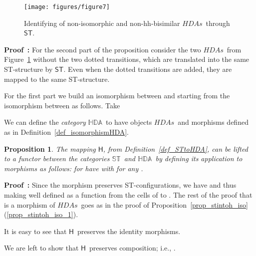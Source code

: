 \documentclass[submission,copyright,creativecommons]{eptcs}
\newtheorem{proposition}[theorem]{Proposition}
\newenvironment{proof}[1][\!\!\,]{\vspace{1ex}\noindent\textbf{Proof #1: }}{\hfill\vspace{2ex}}
\newcommand{\cp}[1]{}
\newcommand\HDAs{\ensuremath{\mathit{HDAs}}}
\newcommand\allST{\ensuremath{\mathbb{ST}}}
\newcommand\allHDA{\ensuremath{\mathbb{HDA}}}
\newcommand\stintoh{\ensuremath{\mathsf{H}}}
\newcommand\hintost{\ensuremath{\mathsf{ST}}}
\newcommand\categoryST{\ensuremath{\allST}}
\newcommand\categoryHDA{\ensuremath{\allHDA}}
\begin{document}
\begin{figure}[tp]
\psfrag{HDA}{{\scriptsize on \HDAs}}
  \begin{center}
    \texttt{[image: figures/figure7]}
  \end{center}
\caption{Identifying of non-isomorphic and non-hh-bisimilar \HDAs\ through \hintost.}
\label{fig_ex_Glabbeek}
\end{figure}

\begin{proof}
For the second part of the proposition consider the two \HDAs\ from Figure~\ref{fig_ex_Glabbeek} without the two dotted transitions, which are translated into the same ST-structure by \hintost. Even when the dotted transitions are added, they are mapped to the same ST-structure.

For the first part we build an isomorphism  between   and  starting from the isomorphism  between  as follows. Take 

\cp{Finish proof for part 1!!}
\end{proof}




We can define the \emph{category} \categoryHDA\ to have objects \HDAs\ and morphisms defined as in Definition~\ref{def_isomorphismHDA}.


\begin{proposition}
The mapping \stintoh, from Definition~\ref{def_STtoHDA}, can be lifted to a functor between the categories \categoryST\ and \categoryHDA\ by defining its application to morphisms as follows: for  have  with  for any .
\end{proposition}

\begin{proof}
Since the morphism  preserves ST-configurations, we have  and thus  making  well defined as a function from the cells of  to . The rest of the proof that  is a morphism of \HDAs\ goes as in the proof of Proposition~\ref{prop_stintoh_iso}(\ref{prop_stintoh_iso_1}).

It is easy to see that \stintoh\ preserves the identity morphisms.

We are left to show that \stintoh\ preserves composition; i.e., .
\cp{Finish!!}
\end{proof}
\end{document}
